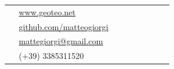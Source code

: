 \documentclass[10pt]{article} %
\begin{document}
\begin{paracol}{2}
    \parbox[top][0.12\textheight][c]{\linewidth}{ %
        \vspace{-0.04\textheight} %
        \colorbox{shade}{ %
            \begin{supertabular}{p{0.05\linewidth}|p{0.775\linewidth}} %
                \raisebox{-1pt}{\faGlobe} & \href{https://www.geoteo.net}{www.geoteo.net} \\ %
                \raisebox{-1pt}{\faGithub} & \href{https://github.com/matteogiorgi}{github.com/matteogiorgi} \\ %
                \raisebox{-1pt}{\faEnvelopeSquare} & \href{mailto:mattegiorgi@gmail.com}{mattegiorgi@gmail.com} \\ %
                \raisebox{-1pt}{\faPhoneSquare} & (+39) 3385311520 \\ %
            \end{supertabular}
        }
    }



\end{paracol}
\end{document}
